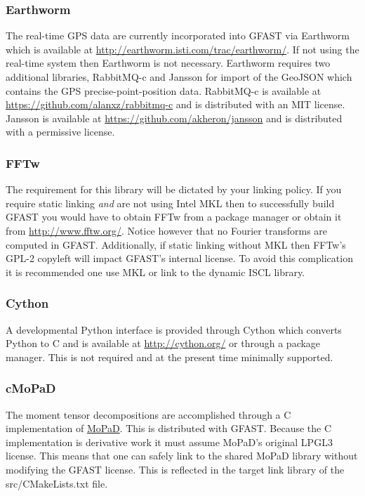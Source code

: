 \documentclass[12pt]{article}
\begin{document}
\subsubsection{Earthworm}
The real-time GPS data are currently incorporated into GFAST via Earthworm which is
available at \url{http://earthworm.isti.com/trac/earthworm/}.  If not using the real-time
system then Earthworm is not necessary.  Earthworm requires two
additional libraries, RabbitMQ-c and Jansson for import of the GeoJSON which contains the GPS
precise-point-position data.  RabbitMQ-c 
is available at \url{https://github.com/alanxz/rabbitmq-c} and is distributed with an 
MIT license.  Jansson is available at \url{https://github.com/akheron/jansson} and
is distributed with a permissive license. 

\subsubsection{FFTw}
The requirement for this library will be dictated by your linking policy.  If you require 
static linking \emph{and} are not using Intel MKL then to successfully build GFAST you would 
have to obtain FFTw from a package manager or obtain it from \url{http://www.fftw.org/}.
Notice however that no Fourier transforms are computed in GFAST.  Additionally, if static
linking without MKL then FFTw's GPL-2 copyleft will impact GFAST's internal license.
To avoid this complication it is recommended one use MKL or link to the dynamic ISCL library.  

\subsubsection{Cython}
A developmental Python interface is provided through Cython which converts Python to C and is 
available at \url{http://cython.org/} or through a package manager.  This is not required and
at the present time minimally supported.

\subsubsection{cMoPaD}
The moment tensor decompositions are accomplished through a C implementation of 
\href{https://github.com/geophysics/MoPaD}{MoPaD}.  This is distributed with GFAST.  
Because the C implementation is derivative work it must assume MoPaD's original 
LPGL3 license.  This means that one can safely link to the shared MoPaD library without
modifying the GFAST license.  This is reflected in the target link library of the 
src/CMakeLists.txt  file.
\end{document}
